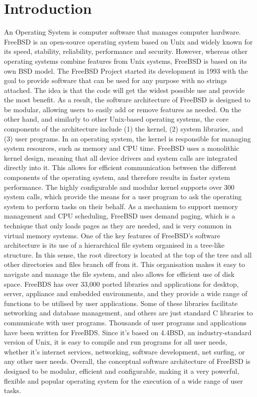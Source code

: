 \documentclass[12pt, dvipsnames, a4paper]{article}
\begin{document}
\vfill
\hspace{0pt}
\newpage
\tableofcontents
\clearpage

\section{Introduction}
An Operating System is computer software that manages computer hardware. FreeBSD is an open-source operating system based on Unix and widely known for its speed, stability, reliability, performance and security. However, whereas other operating systems combine features from Unix systems, FreeBSD is based on its own BSD model.
The FreeBSD Project started its development in 1993 with the goal to provide software that can be used for any purpose with no strings attached. The idea is that the code will get the widest possible use and provide the most benefit. As a result, the software architecture of FreeBSD is designed to be modular, allowing users to easily add or remove features as needed. On the other hand, and similarly to other Unix-based operating systems, the core components of the architecture include (1) the kernel, (2) system libraries, and (3) user programs.
In an operating system, the kernel is responsible for managing system resources, such as memory and CPU time. FreeBSD uses a monolithic kernel design, meaning that all device drivers and system calls are integrated directly into it. This allows for efficient communication between the different components of the operating system, and therefore results in faster system performance. The highly configurable and modular kernel supports over 300 system calls, which provide the means for a user program to ask the operating system to perform tasks on their behalf. As a mechanism to support memory management and CPU scheduling, FreeBSD uses demand paging, which is a technique that only loads pages as they are needed, and is very common in virtual memory systems.
One of the key features of FreeBSD's software architecture is its use of a hierarchical file system organised in a tree-like structure. In this sense, the root directory is located at the top of the tree and all other directories and files branch off from it. This organisation makes it easy to navigate and manage the file system, and also allows for efficient use of disk space.
FreeBDS has over 33,000 ported libraries and applications for desktop, server, appliance and embedded environments, and they provide a wide range of functions to be utilised by user applications. Some of these libraries facilitate networking and database management, and others are just standard C libraries to communicate with user programs.
Thousands of user programs and applications have been written for FreeBDS. Since it’s based on 4.4BSD, an industry-standard version of Unix, it is easy to compile and run programs for all user needs, whether it’s internet services, networking, software development, net surfing, or any other user needs.
Overall, the conceptual software architecture of FreeBSD is designed to be modular, efficient and configurable, making it a very powerful, flexible and popular operating system for the execution of a wide range of user tasks.
\end{document}
